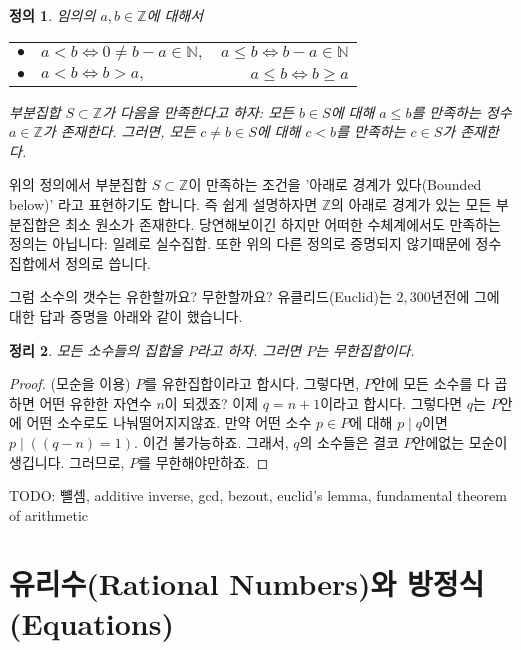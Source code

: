 \documentclass[a4paper, 11pt]{report}
\renewcommand{\<}{\langle}
\renewcommand{\>}{\rangle}
\newtheorem{thm}{정리}[section]
\newtheorem{dfn}[thm]{정의}
\begin{document}
\begin{dfn}\label{axiom_int_1}
  임의의 $a, b \in \mathbb{Z}$에 대해서
  \begin{center}
    \begin{tabular}{clr}
      $\bullet$ & $a < b \iff 0 \neq b - a \in \mathbb{N},$ & $a \le b \iff b - a \in \mathbb{N}$\\
      $\bullet$ & $a < b \iff b > a,$ & $a \le b \iff b \ge a$\\
    \end{tabular}
  \end{center}
  부분집합 $S \subset \mathbb{Z}$가 다음을 만족한다고 하자: 모든 $b \in S$에 대해 $a \le b$를 만족하는
  정수 $a \in \mathbb{Z}$가 존재한다. 그러면, 모든 $c \neq b \in S$에 대해 $c < b$를 만족하는 $c \in S$가
  존재한다.
\end{dfn}

위의 정의에서 부분집합 $S \subset \mathbb{Z}$이 만족하는 조건을 '아래로 경계가 있다(Bounded below)'
라고 표현하기도 합니다. 즉 쉽게 설명하자면 $\mathbb{Z}$의 아래로 경계가 있는 모든 부분집합은 최소 원소가 존재한다.
당연해보이긴 하지만 어떠한 수체계에서도 만족하는 정의는 아닙니다: 일례로 실수집합. 또한 위의 다른 정의로 
증명되지 않기때문에 정수집합에서 정의로 씁니다.
  


그럼 소수의 갯수는 유한할까요? 무한할까요? 유클리드(Euclid)는 $2,300$년전에 그에 대한 답과
증명을 아래와 같이 했습니다.

\begin{thm}
  모든 소수들의 집합을 $P$라고 하자. 그러면 $P$는 무한집합이다. 
\end{thm}

\begin{proof}
  (모순을 이용) $P$를 유한집합이라고 합시다. 그렇다면, $P$안에 모든 소수를 다 곱하면 어떤 유한한 
  자연수 $n$이 되겠죠? 이제 $q = n+1$이라고 합시다. 그렇다면 $q$는 $P$안에 어떤 소수로도 나눠떨어지지않죠.
  만약 어떤 소수 $p \in P$에 대해 $p \mid q$이면 $p \mid ((q-n) = 1)$. 이건 불가능하죠.
  그래서, $q$의 소수들은 결코 $P$안에없는 모순이 생깁니다. 그러므로, $P$를 무한해야만하죠.
\end{proof}

TODO: 뺼셈, additive inverse, gcd, bezout, euclid's lemma, fundamental theorem of arithmetic

\section{유리수(Rational Numbers)와 방정식(Equations)}
\end{document}

